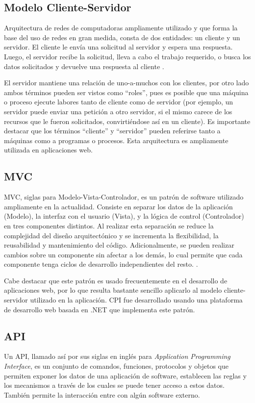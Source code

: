 \subsection{Modelo Cliente-Servidor}
Arquitectura de redes de computadoras ampliamente utilizado y que forma la base del uso de redes en gran medida, consta de dos entidades: un cliente y un servidor. El cliente le envía una solicitud al servidor y espera una respuesta. Luego, el servidor recibe la solicitud, lleva a cabo el trabajo requerido, o busca los datos solicitados y devuelve una respuesta al cliente \cite{redesTanenbaum}.

El servidor mantiene una relación de uno-a-muchos con los clientes, por otro lado ambos términos pueden ser vistos como “roles”, pues es posible que una máquina o proceso ejecute labores tanto de cliente como de servidor (por ejemplo, un servidor puede enviar una petición a otro servidor, si el mismo carece de los recursos que le fueron solicitados, convirtiéndose así en un cliente). Es importante destacar que los términos “cliente” y “servidor” pueden referirse tanto a máquinas como a programas o procesos. Esta arquitectura es ampliamente utilizada en aplicaciones web.

\subsection{MVC}
MVC, siglas para Modelo-Vista-Controlador, es un patrón de software utilizado ampliamente en la actualidad. Consiste en separar los datos de la aplicación (Modelo), la interfaz con el usuario (Vista), y la lógica de control (Controlador) en tres componentes distintos. Al realizar esta separación se reduce la complejidad del diseño arquitectónico y se incrementa la flexibilidad, la reusabilidad y mantenimiento del código. Adicionalmente, se pueden realizar cambios sobre un componente sin afectar a los demás, lo cual permite que cada componente tenga ciclos de desarrollo independientes del resto. \cite{mvcKrasner}. 

Cabe destacar que este patrón es usado frecuentemente en el desarrollo de aplicaciones web, por lo que resulta bastante sencillo aplicarlo al modelo cliente-servidor utilizado en la aplicación. CPI fue desarrollado usando una plataforma de desarrollo web basada en .NET que implementa este patrón.

\subsection{API}
Un API, llamado así por sus siglas en inglés para \textit{Application Programming Interface}, es un conjunto de comandos, funciones, protocolos y objetos que permiten exponer los datos de una aplicación de software, establecen las reglas y los mecanismos a través de los cuales se puede tener acceso a estos datos. También permite la interacción entre con algún software externo.\cite{apiChristensson}

